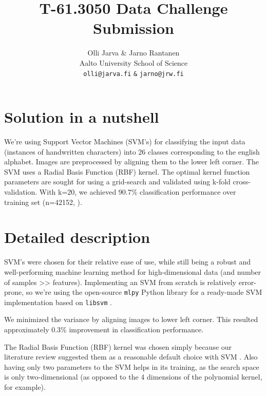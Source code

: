 \documentclass{netsec2012}
\begin{document}

\title{T-61.3050 Data Challenge Submission}

\author{Olli Jarva \& Jarno Rantanen \\
        Aalto University School of Science \\
	\texttt{olli@jarva.fi} \texttt{\&} \texttt{jarno@jrw.fi}}
\maketitle


\section{Solution in a nutshell}

We're using Support Vector Machines (SVM's) for classifying the input data (instances of 
handwritten characters) into 26 classes corresponding to the english alphabet. Images are 
preprocessed by aligning them to the lower left corner. The SVM uses a Radial Basis Function 
(RBF) kernel. The optimal kernel function parameters are sought for using 
a grid-search and validated using k-fold cross-validation. With k=20, we achieved 90.7\% 
classification performance over training set (n=42152, \cite{training_set}).

\section{Detailed description}

SVM's were chosen for their relative ease of use, while still being a robust and well-performing 
machine learning method for high-dimensional data (and number of samples >> features).  Implementing an SVM from scratch is 
relatively error-prone, so we're using the open-source \texttt{mlpy} \cite{mlpy} Python library for a 
ready-made SVM implementation based on \texttt{libsvm} \cite{libsvm}.

We minimized the variance by aligning images to lower left corner. This resulted approximately 0.3\%
improvement in classification performance.

The Radial Basis Function (RBF) kernel was chosen simply because our literature review suggested 
them as a reasonable default choice with SVM \cite{libsvm_guide,svm_chemistry}.  Also having only two parameters to the SVM helps in 
its training, as the search space is only two-dimensional (as opposed to the 4 dimensions of the 
polynomial kernel, for example). 
\end{document}

